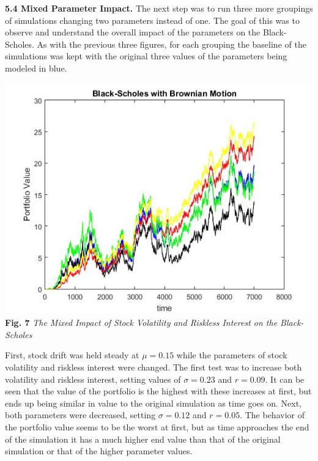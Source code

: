 \documentclass{report}
\begin{document}
	\textbf{5.4 Mixed Parameter Impact.} The next step was to run three more groupings of simulations changing two parameters instead of one. The goal of this was to observe and understand the overall impact of the parameters on the Black-Scholes. As with the previous three figures, for each grouping the baseline of the simulations was kept with the original three values of the parameters being modeled in blue.
	\begin{center}
		\includegraphics[scale=0.4]{ivimpact}
		\\\textbf{Fig. 7} \textit{The Mixed Impact of Stock Volatility and Riskless Interest on the Black-Scholes}
	\end{center}
	
	First, stock drift was held steady at $\mu = 0.15$ while the parameters of stock volatility and riskless interest were changed. The first test was to increase both volatility and riskless interest, setting values of $\sigma = 0.23$ and $r = 0.09$. It can be seen that the value of the portfolio is the highest with these increases at first, but ends up being similar in value to the original simulation as time goes on. Next, both parameters were decreased, setting $\sigma = 0.12$ and $r=0.05$. The behavior of the portfolio value seems to be the worst at first, but as time approaches the end of the simulation it has a much higher end value than that of the original simulation or that of the higher parameter values.
	\\
	
\end{document}
